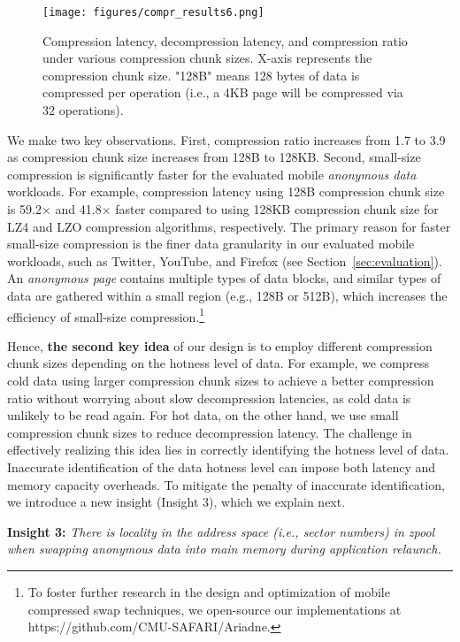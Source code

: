 \begin{figure}[!h]
\centering
\texttt{[image: figures/compr\_results6.png]}
\caption{Compression latency, decompression latency, and compression ratio under various compression chunk sizes. X-axis represents the compression chunk size. "128B" means 128 bytes of data is compressed per operation (i.e., a 4KB page will be compressed via 32 operations).}
\label{fig:comprresults}
\end{figure}

We make two key observations. First, compression ratio increases from 1.7 to 3.9 as compression chunk size increases from 128B to 128KB.  Second, small-size compression is significantly faster for the evaluated mobile \emph{anonymous data} workloads.  For example, compression latency using 128B compression chunk size is 59.2$\times$ and 41.8$\times$ faster compared to using 128KB compression chunk size for LZ4 and LZO compression algorithms, respectively. The primary reason for faster small-size compression is the finer data granularity in our evaluated mobile workloads, such as Twitter, YouTube, and Firefox (see Section~\ref{sec:evaluation}). An \emph{anonymous page} contains multiple types of data blocks, and similar types of data are gathered within a small region (e.g., 128B or 512B), which increases the efficiency of small-size compression.\footnote{To foster further research in the design and optimization of mobile compressed swap techniques, we open-source our implementations at https://github.com/CMU-SAFARI/Ariadne.} 

Hence, \textbf{the second key idea} of our design is to employ different compression chunk sizes depending on the hotness level of data. For example, we compress cold data using larger compression chunk sizes to achieve a better compression ratio without worrying about slow decompression latencies, as cold data is unlikely to be read again. For hot data, on the other hand, we use small compression chunk sizes to reduce decompression latency.  
The challenge in effectively realizing this idea lies in correctly identifying the hotness level of data. Inaccurate identification of the data hotness level can impose both latency and memory capacity overheads. To mitigate the penalty of inaccurate identification, we introduce a new insight (Insight 3), which we explain next.



\noindent\textbf{Insight 3:} \textit{There is locality in the address space (i.e., sector numbers) in \emph{zpool} when swapping anonymous data into main memory during application relaunch.} 

